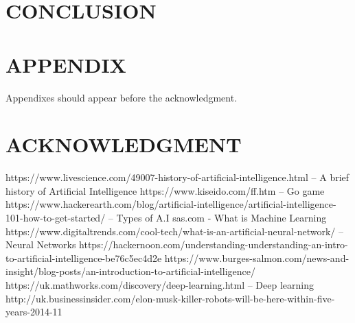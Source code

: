 \documentclass[letterpaper, 10 pt, conference]{ieeeconf}  %
\begin{document}

 
\section{CONCLUSION}



\addtolength{\textheight}{-12cm}   %

\section*{APPENDIX}

Appendixes should appear before the acknowledgment.

\section*{ACKNOWLEDGMENT}

\begin{thebibliography}{99}

 https://www.livescience.com/49007-history-of-artificial-intelligence.html -- A brief history of Artificial Intelligence
 https://www.kiseido.com/ff.htm -- Go game 
 https://www.hackerearth.com/blog/artificial-intelligence/artificial-intelligence-101-how-to-get-started/ -- Types of A.I
 sas.com - What is Machine Learning
 https://www.digitaltrends.com/cool-tech/what-is-an-artificial-neural-network/ -- Neural Networks
 https://hackernoon.com/understanding-understanding-an-intro-to-artificial-intelligence-be76c5ec4d2e
 https://www.burges-salmon.com/news-and-insight/blog-posts/an-introduction-to-artificial-intelligence/
 https://uk.mathworks.com/discovery/deep-learning.html -- Deep learning
 http://uk.businessinsider.com/elon-musk-killer-robots-will-be-here-within-five-years-2014-11



\end{thebibliography}
\end{document}
